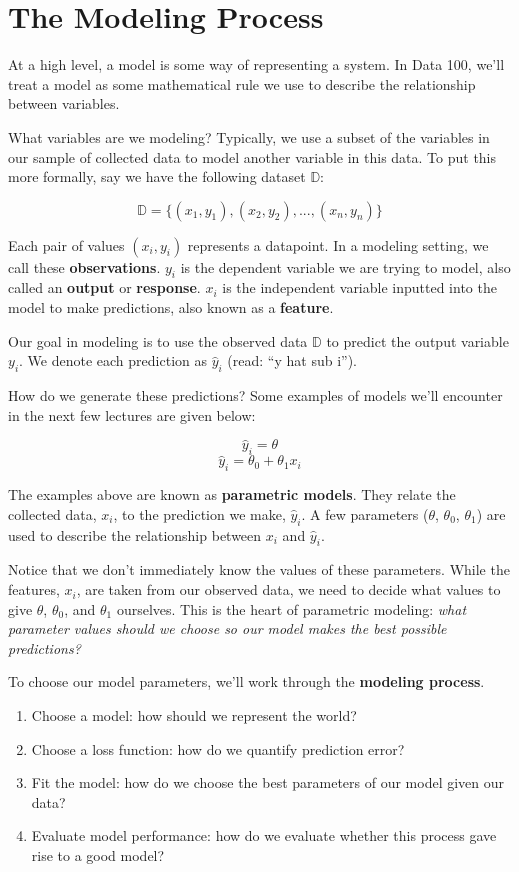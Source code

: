 \documentclass[
  letterpaper,
  DIV=11,
  numbers=noendperiod]{scrreprt}
\providecommand{\tightlist}{%
  \setlength{\itemsep}{0pt}\setlength{\parskip}{0pt}}\usepackage{longtable,booktabs,array}
\begin{document}
\hypertarget{the-modeling-process}{%
\section{The Modeling Process}\label{the-modeling-process}}

At a high level, a model is some way of representing a system. In Data
100, we'll treat a model as some mathematical rule we use to describe
the relationship between variables.

What variables are we modeling? Typically, we use a subset of the
variables in our sample of collected data to model another variable in
this data. To put this more formally, say we have the following dataset
\(\mathbb{D}\):

\[\mathbb{D} = \{(x_1, y_1), (x_2, y_2), ..., (x_n, y_n)\}\]

Each pair of values \((x_i, y_i)\) represents a datapoint. In a modeling
setting, we call these \textbf{observations}. \(y_i\) is the dependent
variable we are trying to model, also called an \textbf{output} or
\textbf{response}. \(x_i\) is the independent variable inputted into the
model to make predictions, also known as a \textbf{feature}.

Our goal in modeling is to use the observed data \(\mathbb{D}\) to
predict the output variable \(y_i\). We denote each prediction as
\(\hat{y}_i\) (read: ``y hat sub i'').

How do we generate these predictions? Some examples of models we'll
encounter in the next few lectures are given below:

\[\hat{y}_i = \theta\] \[\hat{y}_i = \theta_0 + \theta_1 x_i\]

The examples above are known as \textbf{parametric models}. They relate
the collected data, \(x_i\), to the prediction we make, \(\hat{y}_i\). A
few parameters (\(\theta\), \(\theta_0\), \(\theta_1\)) are used to
describe the relationship between \(x_i\) and \(\hat{y}_i\).

Notice that we don't immediately know the values of these parameters.
While the features, \(x_i\), are taken from our observed data, we need
to decide what values to give \(\theta\), \(\theta_0\), and \(\theta_1\)
ourselves. This is the heart of parametric modeling: \emph{what
parameter values should we choose so our model makes the best possible
predictions?}

To choose our model parameters, we'll work through the \textbf{modeling
process}.

\begin{enumerate}
\def\labelenumi{\arabic{enumi}.}
\tightlist
\item
  Choose a model: how should we represent the world?
\item
  Choose a loss function: how do we quantify prediction error?
\item
  Fit the model: how do we choose the best parameters of our model given
  our data?
\item
  Evaluate model performance: how do we evaluate whether this process
  gave rise to a good model?
\end{enumerate}
\end{document}
